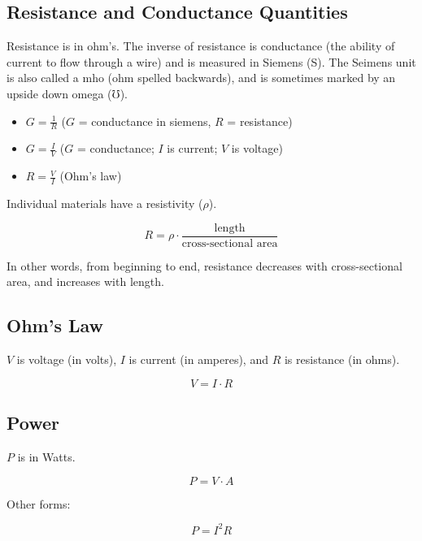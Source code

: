 \subsection{Resistance and Conductance Quantities}

Resistance is in ohm's.  The inverse of resistance is conductance (the ability of current to flow through a wire) and is measured in Siemens (S).  The Seimens unit is also called a mho (ohm spelled backwards), and is sometimes marked by an upside down omega (℧).

\begin{itemize}
\item $G = \frac{1}{R}$ ($G$ = conductance in siemens, $R$ = resistance)
\item $G = \frac{I}{V}$ ($G$ = conductance; $I$ is current; $V$ is voltage)
\item $R = \frac{V}{I}$ (Ohm's law)
\end{itemize}

Individual materials have a resistivity ($\rho$).

\begin{equation}
R = \rho \cdot \frac{\textrm{length}}{\textrm{cross-sectional area}}
\end{equation}

In other words, from beginning to end, resistance decreases with cross-sectional area, and increases with length.

\subsection{Ohm's Law}

$V$ is voltage (in volts), $I$ is current (in amperes), and $R$ is resistance (in ohms).

\begin{equation}
V = I\cdot R
\end{equation}

\subsection{Power}

$P$ is in Watts.

\begin{equation}
P = V\cdot A
\end{equation}

Other forms:

\begin{equation}
P = I^2R
\end{equation}

